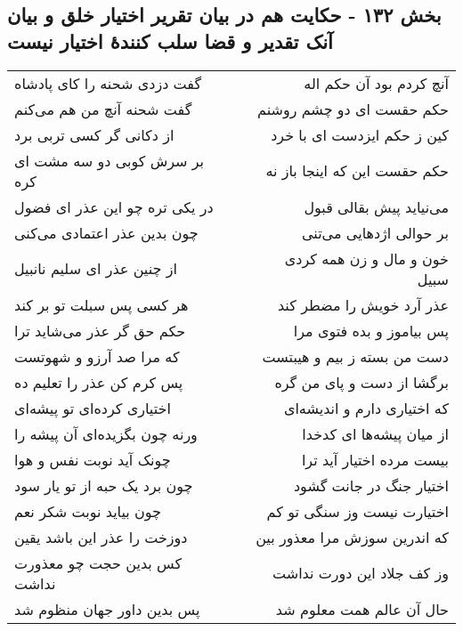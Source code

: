 \begin{center}
\section*{بخش ۱۳۲ - حکایت هم در بیان تقریر اختیار خلق و بیان آنک تقدیر و قضا سلب کنندهٔ اختیار نیست}
\label{sec:sh132}
\begin{longtable}{l p{0.5cm} r}
گفت دزدی شحنه را کای پادشاه
&&
آنچ کردم بود آن حکم اله
\\
گفت شحنه آنچ من هم می‌کنم
&&
حکم حقست ای دو چشم روشنم
\\
از دکانی گر کسی تربی برد
&&
کین ز حکم ایزدست ای با خرد
\\
بر سرش کوبی دو سه مشت ای کره
&&
حکم حقست این که اینجا باز نه
\\
در یکی تره چو این عذر ای فضول
&&
می‌نیاید پیش بقالی قبول
\\
چون بدین عذر اعتمادی می‌کنی
&&
بر حوالی اژدهایی می‌تنی
\\
از چنین عذر ای سلیم نانبیل
&&
خون و مال و زن همه کردی سبیل
\\
هر کسی پس سبلت تو بر کند
&&
عذر آرد خویش را مضطر کند
\\
حکم حق گر عذر می‌شاید ترا
&&
پس بیاموز و بده فتوی مرا
\\
که مرا صد آرزو و شهوتست
&&
دست من بسته ز بیم و هیبتست
\\
پس کرم کن عذر را تعلیم ده
&&
برگشا از دست و پای من گره
\\
اختیاری کرده‌ای تو پیشه‌ای
&&
که اختیاری دارم و اندیشه‌ای
\\
ورنه چون بگزیده‌ای آن پیشه را
&&
از میان پیشه‌ها ای کدخدا
\\
چونک آید نوبت نفس و هوا
&&
بیست مرده اختیار آید ترا
\\
چون برد یک حبه از تو یار سود
&&
اختیار جنگ در جانت گشود
\\
چون بیاید نوبت شکر نعم
&&
اختیارت نیست وز سنگی تو کم
\\
دوزخت را عذر این باشد یقین
&&
که اندرین سوزش مرا معذور بین
\\
کس بدین حجت چو معذورت نداشت
&&
وز کف جلاد این دورت نداشت
\\
پس بدین داور جهان منظوم شد
&&
حال آن عالم همت معلوم شد
\\
\end{longtable}
\end{center}

